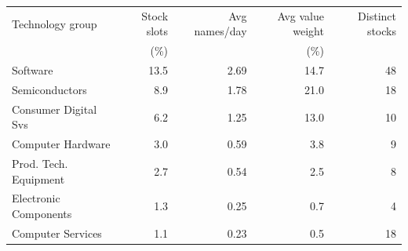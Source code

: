 \begin{tabular}{lrrrr}
\toprule
Technology group & Stock slots & Avg names/day & Avg value weight & Distinct stocks \\
 & (\%) & & (\%) & \\
\midrule
Software & 13.5 & 2.69 & 14.7 & 48 \\
Semiconductors & 8.9 & 1.78 & 21.0 & 18 \\
Consumer Digital Svs & 6.2 & 1.25 & 13.0 & 10 \\
Computer Hardware & 3.0 & 0.59 & 3.8 & 9 \\
Prod. Tech. Equipment & 2.7 & 0.54 & 2.5 & 8 \\
Electronic Components & 1.3 & 0.25 & 0.7 & 4 \\
Computer Services & 1.1 & 0.23 & 0.5 & 18 \\
\bottomrule
\end{tabular}
